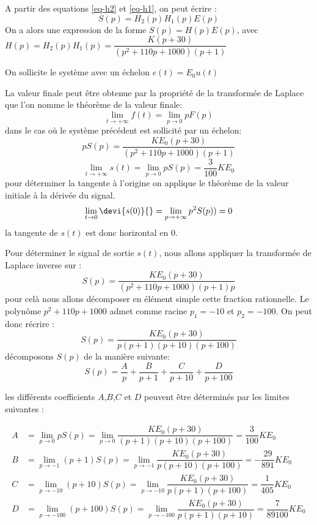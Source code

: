 \question{}
A partir des equations \ref{eq-h2} et \ref{eq-h1}, on peut écrire :
$$
S(p) = H_2(p) H_1(p) E(p)
$$
On a alors une expression de la forme $S(p) =H(p) E(p)$,
avec $H(p)=H_2(p) H_1(p)=\dfrac{K(p+30)}{(p^2+110p+1000)(p+1)}$
\begin{center}
\end{center}
On sollicite le système avec un échelon $e(t)=E_0 u(t)$

\question{}
La valeur finale peut être obtenue par la propriété de la transformée 
de Laplace que l'on nomme le théorème de la valeur finale:
$$
\lim\limits_{t \rightarrow +\infty} f(t) = \lim\limits_{p \rightarrow 0} pF(p)
$$
dans le cas où le système précédent est sollicité par un échelon:
$$
pS(p)=\dfrac{KE_0(p+30)}{(p^2+110p+1000)(p+1)}
$$
$$
\lim\limits_{t \rightarrow +\infty} s(t) = \lim\limits_{p \rightarrow 0} pS(p) 
                                         = \dfrac{3}{100}KE_0
$$
pour déterminer la tangente à l'origine on applique le théorème de la valeur 
initiale à la dérivée du signal.
$$
\lim\limits_{t \rightarrow 0} \devi{s(0)}{} = 
\lim\limits_{p \rightarrow +\infty} p^2S(p))= 0
$$
la tangente de $s(t)$ est donc horizontal en 0.


\question{}
Pour déterminer le signal de sortie $s(t)$, nous allons appliquer la 
transformée de Laplace inverse sur :
$$
S(p) = \dfrac{KE_0(p+30)}{(p^2+110p+1000)(p+1)p}
$$
pour celà nous allons décomposer en élément simple cette fraction rationnelle. 
Le polynôme $p^2+110p+1000$ admet comme racine $p_1=-10$ et $p_2=-100$. 
On peut donc récrire : 
$$
S(p)=\dfrac{KE_0(p+30)}{p(p+1)(p+10)(p+100)}
$$
décomposons $S(p)$ de la manière suivante:
$$
S(p)=\dfrac{A}{p}+\dfrac{B}{p+1}+\dfrac{C}{p+10}+\dfrac{D}{p+100}
$$

les différents coefficients $A$,$B$,$C$ et $D$ peuvent être déterminés par 
les limites suivantes :

\begin{align*}
    A&=\lim\limits_{p \rightarrow 0} p S(p) = 
    \lim\limits_{p \rightarrow 0} 
    \dfrac{KE_0(p+30)}{(p+1)(p+10)(p+100)} =
    \dfrac{3}{100}KE_0 \\
    B&=\lim\limits_{p \rightarrow -1} (p+1) S(p) = 
    \lim\limits_{p \rightarrow -1} 
    \dfrac{KE_0(p+30)}{p(p+10)(p+100)}=
    -\dfrac{29}{891}KE_0\\
    C&=\lim\limits_{p \rightarrow -10} (p+10) S(p) = 
    \lim\limits_{p \rightarrow -10} 
    \dfrac{KE_0(p+30)}{p(p+1)(p+100)}=
    \dfrac{1}{405}KE_0 \\
    D&=\lim\limits_{p \rightarrow -100} (p+100) S(p) = 
    \lim\limits_{p \rightarrow -100} 
    \dfrac{KE_0(p+30)}{p(p+1)(p+10)}=
    \dfrac{7}{89100}KE_0 
\end{align*}

